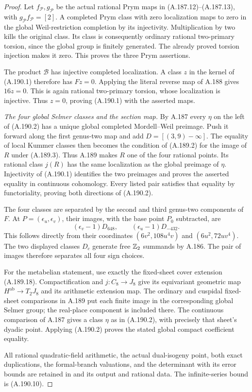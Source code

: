 \begin{proof}
Let \(f_{\mathcal P},g_{\mathcal P}\) be the
actual rational Prym maps in (A.187.12)--(A.187.13),
with \(g_{\mathcal P}f_{\mathcal P}=[2]\).
A completed Prym class with zero localization
maps to zero in the global Weil-restriction
completion by its injectivity.  Multiplication
by two kills the original class.  Its class
is consequently ordinary rational two-primary
torsion, since the global group is finitely
generated.  The already proved torsion
injection makes it zero.  This proves the
three Prym assertions.

The product \(\mathcal B\) has injective
completed localization.  A class \(z\) in
the kernel of (A.190.1) therefore has \(Fz=0\).
Applying the literal reverse map of A.188
gives \(16z=0\).  This is again rational
two-primary torsion, whose localization is
injective.  Thus \(z=0\), proving (A.190.1)
with the asserted maps.

\emph{The four global Selmer classes and the section map.}
By A.187 every \(\eta\) on the left of
(A.190.2) has a unique global completed
Mordell--Weil preimage.  Push it forward
along the first genus-two map and add
\(D=[(3,9)-\infty]\).  The equality of
local Kummer classes then becomes the
condition of (A.189.2) for the image of
\(R\) under (A.189.3).  Thus A.189 makes
\(R\) one of the four rational points.
Its rational class \(j(R)\) has the same
localization as the global preimage of
\(\eta\).  Injectivity of (A.190.1)
identifies the two preimages and proves
the asserted equality in continuous
cohomology.  Every listed pair satisfies
that equality by functoriality, proving
both directions of (A.190.2).

The four classes are separated by the second
and third genus-two components of \(F\).
At \(P=(\epsilon_u,\epsilon_v)\), their
images, with the base point \(P_0\)
subtracted, are
\[
       (\epsilon_v-1)D_{648},\qquad
       (\epsilon_u-1)D_{-432}.
\tag{A.190.12}
\]
This follows directly from their coordinates
\((6v^2,108u^4v)\) and
\((6u^2,72uv^4)\).  The two displayed
classes \(D_c\) generate free \(\mathbb Z_2\)
summands by A.186.  The pair of images
therefore separates all four sign choices.

For the metabelian statement, use exactly
the fixed-sheet cover extension (A.189.18).
Compactification and \(j:C_8\to J_8\)
give its equivariant geometric map
\(H^{\mathrm{ab}}\to T_2J_8\) and its
arithmetic extension map.  The ordinary
and cuspidal fixed-sheet comparisons in
A.189 put each finite image in the
corresponding global Selmer group; the
real-place component is included there.
The continuous comparison of A.187
gives a class \(\eta\) as in (A.190.2),
with precisely that sheet's dyadic point.
Applying (A.190.2) proves the stated
global compact coefficient equality.

All rational quadratic-field arithmetic,
the actual dual-isogeny point, both exact
duplications, the formal-branch valuations,
and the determinant with its error bounds
are retained in
and its output and rational data.  The
infinite-series bound is (A.190.10).
\end{proof}
